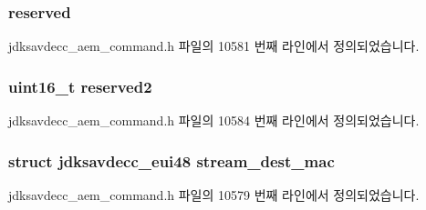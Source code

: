 \subsubsection[{\texorpdfstring{reserved}{reserved}}]{ reserved}\hypertarget{structjdksavdecc__aem__command__set__stream__info_acb7bc06bed6f6408d719334fc41698c7}{}\label{structjdksavdecc__aem__command__set__stream__info_acb7bc06bed6f6408d719334fc41698c7}


jdksavdecc\+\_\+aem\+\_\+command.\+h 파일의 10581 번째 라인에서 정의되었습니다.

\subsubsection[{\texorpdfstring{reserved2}{reserved2}}]{\setlength{\rightskip}{0pt plus 5cm}uint16\+\_\+t reserved2}\hypertarget{structjdksavdecc__aem__command__set__stream__info_a0fc429b055e74830a4583ec37f5c3846}{}\label{structjdksavdecc__aem__command__set__stream__info_a0fc429b055e74830a4583ec37f5c3846}


jdksavdecc\+\_\+aem\+\_\+command.\+h 파일의 10584 번째 라인에서 정의되었습니다.

\subsubsection[{\texorpdfstring{stream\+\_\+dest\+\_\+mac}{stream_dest_mac}}]{\setlength{\rightskip}{0pt plus 5cm}struct {\bf jdksavdecc\+\_\+eui48} stream\+\_\+dest\+\_\+mac}\hypertarget{structjdksavdecc__aem__command__set__stream__info_acb9f6beb748e2b0e9086f809a4b3143d}{}\label{structjdksavdecc__aem__command__set__stream__info_acb9f6beb748e2b0e9086f809a4b3143d}


jdksavdecc\+\_\+aem\+\_\+command.\+h 파일의 10579 번째 라인에서 정의되었습니다.

